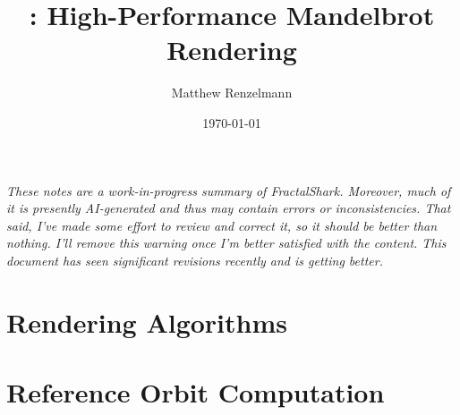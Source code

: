 \documentclass[12pt]{article}
\title{\FractalShark{}: High-Performance Mandelbrot Rendering}
\author{Matthew Renzelmann}
\date{\today}
\newcommand{\FractalShark}{\textit{FractalShark}}
\begin{document}
\maketitle

\vspace{1em}

\begin{center}
\textit{These notes are a work-in-progress summary of \FractalShark{}. Moreover,
much of it is presently AI-generated and thus may contain errors or
inconsistencies.  That said, I've made some effort to review and correct it, so
it should be better than nothing.  I'll remove this warning once I'm better
satisfied with the content.  This document has seen significant revisions
recently and is getting better.}
\end{center}

\renewcommand\numberline[1]{#1\enspace}

\tableofcontents
\listoffigures
\listoftables
\clearpage



\clearpage





\part{Rendering Algorithms}












\part{Reference Orbit Computation}
\end{document}
